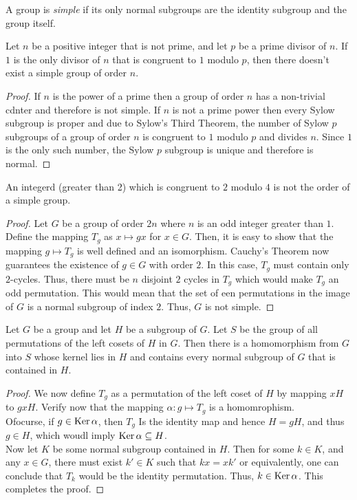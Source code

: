 \begin{definition}
	A group is \textit{simple} if its only normal subgroups are the identity subgroup and the group itself.
\end{definition}

\begin{proposition}
	Let $n$ be a positive integer that is not prime, and let $p$ be a prime divisor of $n$. If $1$ is the only divisor of $n$ that is congruent to $1$ modulo $p$, then there doesn't exist a simple group of order $n$.
\end{proposition}
\begin{proof}
	If $n$ is the power of a prime then a group of order $n$ has a non-trivial cdnter and therefore is not simple. If $n$ is not a prime power then every Sylow subgroup is proper and due to Sylow's Third Theorem, the number of Sylow $p$ subgroups of a group of order $n$ is congruent to $1$ modulo $p$ and divides $n$. Since $1$ is the only such number, the Sylow $p$ subgroup is unique and therefore is normal.
\end{proof}

\begin{proposition}
	An integerd (greater than 2) which is congruent to $2$ modulo $4$ is not the order of a simple group. 
\end{proposition}
\begin{proof}
	Let $G$ be a group of order $2n$ where $n$ is an odd integer greater than $1$. Define the mapping $T_g$ as $x\mapsto gx$ for $x\in G$. Then, it is easy to show that the mapping $g\mapsto T_g$ is well defined and an isomorphism. Cauchy's Theorem now guarantees the existence of $g\in G$ with order $2$. In this case, $T_g$ must contain only $2$-cycles. Thus, there must be $n$ disjoint $2$ cycles in $T_g$ which would make $T_g$ an odd permutation. This would mean that the set of een permutations in the image of $G$ is a normal subgroup of index $2$. Thus, $G$ is not simple. 
\end{proof}

\begin{proposition}
	Let $G$ be a group and let $H$ be a subgroup of $G$. Let $S$ be the group of all permutations of the left cosets of $H$ in $G$. Then there is a homomorphism from $G$ into $S$ whose kernel lies in $H$ and contains every normal subgroup of $G$ that is contained in $H$.
\end{proposition}
\begin{proof}
	We now define $T_g$ as a permutation of the left coset of $H$ by mapping $xH$ to $gxH$. Verify now that the mapping $\alpha: g\mapsto T_g$ is a homomrophism.\\
	Ofocurse, if $g\in\operatorname{Ker}\alpha$, then $T_g$ Is the identity map and hence $H = gH$, and thus $g\in H$, which woudl imply $\operatorname{Ker}\alpha\subseteq H$. \\
	Now let $K$ be some normal subgroup contained in $H$. Then for some $k\in K$, and any $x\in G$, there must exist $k'\in K$ such that $kx = xk'$ or equivalently, one can conclude that $T_k$ would be the identity permutation. Thus, $k\in\operatorname{Ker}\alpha$. This completes the proof.
\end{proof}

